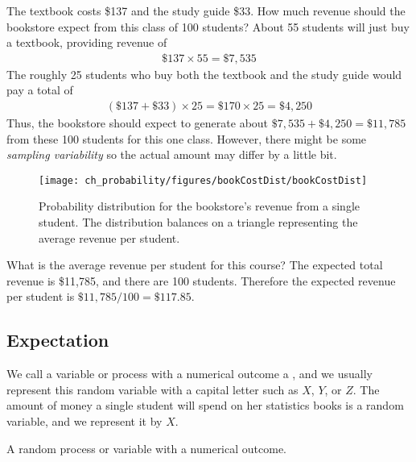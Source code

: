 \begin{example}{The textbook costs \$137 and the study guide \$33. How much revenue should the bookstore expect from this class of 100 students?}\label{bookStoreRev}
About 55 students will just buy a textbook, providing revenue of
\begin{eqnarray*}
\$137 \times  55 = \$7,535
\end{eqnarray*}
The roughly 25 students who buy both the textbook and the study guide would pay a total of
\begin{eqnarray*}
(\$137 + \$33) \times  25 = \$170 \times  25 = \$4,250
\end{eqnarray*}
Thus, the bookstore should expect to generate about $\$7,535 + \$4,250 = \$11,785$ from these 100 students for this one class. However, there might be some \emph{sampling variability} so the actual amount may differ by a little bit.
\end{example}

\begin{figure}[h]
\centering
\texttt{[image: ch\_probability/figures/bookCostDist/bookCostDist]}
\caption{Probability distribution for the bookstore's revenue from a single student. The distribution balances on a triangle representing the average revenue per student.}
\label{bookCostDist}
\end{figure}

\begin{example}{What is the average revenue per student for this course?}\label{revFromStudent}
The expected total revenue is \$11,785, and there are 100 students. Therefore the expected revenue per student is $\$11,785/100 =  \$117.85$.
\end{example}

\subsection{Expectation}


We call a variable or process with a numerical outcome a , and we usually represent this random variable with a capital letter such as $X$, $Y$, or $Z$. The amount of money a single student will spend on her statistics books is a random variable, and we represent it by $X$.

\begin{termBox}{
A random process or variable with a numerical outcome.}
\end{termBox}

